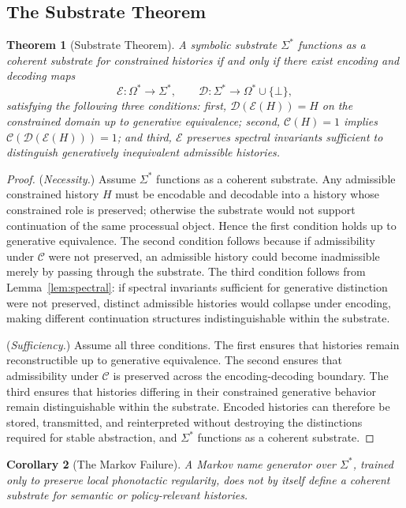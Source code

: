 \documentclass[12pt, a4paper]{article}
\theoremstyle{plain}
\newtheorem{theorem}{Theorem}[section]
\newtheorem{corollary}[theorem]{Corollary}
\theoremstyle{definition}
\theoremstyle{remark}
\begin{document}
\subsection{The Substrate Theorem}

\begin{theorem}[Substrate Theorem]
\label{thm:substrate}
A symbolic substrate $\Sigma^*$ functions as a coherent substrate for constrained histories if and only if there exist encoding and decoding maps
\[
\mathcal{E} : \Omega^* \to \Sigma^*, \qquad \mathcal{D} : \Sigma^* \to \Omega^* \cup \{\bot\},
\]
satisfying the following three conditions: first, $\mathcal{D}(\mathcal{E}(H)) = H$ on the constrained domain up to generative equivalence; second, $\mathcal{C}(H) = 1$ implies $\mathcal{C}(\mathcal{D}(\mathcal{E}(H))) = 1$; and third, $\mathcal{E}$ preserves spectral invariants sufficient to distinguish generatively inequivalent admissible histories.
\end{theorem}

\begin{proof}
(\textit{Necessity.}) Assume $\Sigma^*$ functions as a coherent substrate. Any admissible constrained history $H$ must be encodable and decodable into a history whose constrained role is preserved; otherwise the substrate would not support continuation of the same processual object. Hence the first condition holds up to generative equivalence. The second condition follows because if admissibility under $\mathcal{C}$ were not preserved, an admissible history could become inadmissible merely by passing through the substrate. The third condition follows from Lemma~\ref{lem:spectral}: if spectral invariants sufficient for generative distinction were not preserved, distinct admissible histories would collapse under encoding, making different continuation structures indistinguishable within the substrate.

(\textit{Sufficiency.}) Assume all three conditions. The first ensures that histories remain reconstructible up to generative equivalence. The second ensures that admissibility under $\mathcal{C}$ is preserved across the encoding-decoding boundary. The third ensures that histories differing in their constrained generative behavior remain distinguishable within the substrate. Encoded histories can therefore be stored, transmitted, and reinterpreted without destroying the distinctions required for stable abstraction, and $\Sigma^*$ functions as a coherent substrate.
\end{proof}

\begin{corollary}[The Markov Failure]
A Markov name generator over $\Sigma^*$, trained only to preserve local phonotactic regularity, does not by itself define a coherent substrate for semantic or policy-relevant histories.
\end{corollary}
\end{document}
